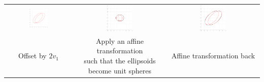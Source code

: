 \documentclass{article}
\begin{document}
\begin{table}[H]
	\centering
	\begin{tabular}{ccc}
		\includegraphics[width=0.3\textwidth]{union_offset_oa/3.pdf} & \includegraphics[width=0.3\textwidth]{union_offset_oa/4.pdf} & \includegraphics[width=0.3\textwidth]{union_offset_oa/5.pdf}\\
		Offset by $2v_1$ & \makecell{Apply an affine transformation \\such that the ellipsoids \\become unit spheres} & Affine transformation back \\

\end{tabular}
\end{table}
\end{document}
